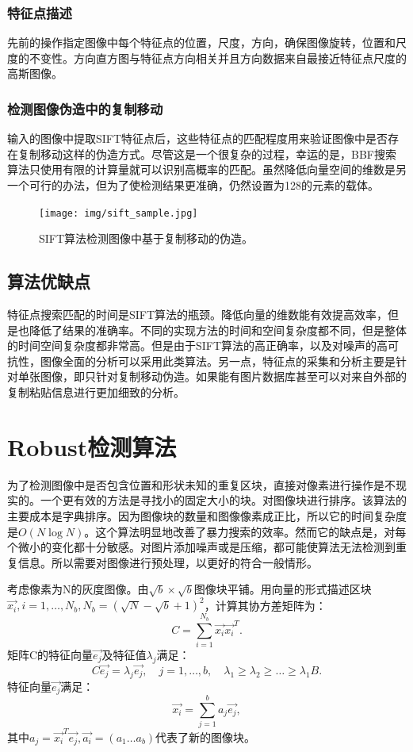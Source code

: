 \documentclass[a4paper, 10pt, notitlepage]{report}
\begin{document}
			\subsubsection{特征点描述}
			先前的操作指定图像中每个特征点的位置，尺度，方向，确保图像旋转，位置和尺度的不变性。方向直方图与特征点方向相关并且方向数据来自最接近特征点尺度的高斯图像。


			\subsubsection{检测图像伪造中的复制移动}
			输入的图像中提取SIFT特征点后，这些特征点的匹配程度用来验证图像中是否存在复制移动这样的伪造方式。尽管这是一个很复杂的过程，幸运的是，BBF搜索算法只使用有限的计算量就可以识别高概率的匹配。虽然降低向量空间的维数是另一个可行的办法，但为了使检测结果更准确，仍然设置为128的元素的载体。
			\begin{figure}[ht]
				\centering
				\texttt{[image: img/sift\_sample.jpg]}
				\caption{SIFT算法检测图像中基于复制移动的伪造。}
				\label{fig-sift}
			\end{figure}

		\subsection{算法优缺点}
		特征点搜索匹配的时间是SIFT算法的瓶颈。降低向量的维数能有效提高效率，但是也降低了结果的准确率。不同的实现方法的时间和空间复杂度都不同，但是整体的时间空间复杂度都非常高。但是由于SIFT算法的高正确率，以及对噪声的高可抗性，图像全面的分析可以采用此类算法。另一点，特征点的采集和分析主要是针对单张图像，即只针对复制移动伪造。如果能有图片数据库甚至可以对来自外部的复制粘贴信息进行更加细致的分析。

	\section{Robust检测算法}
		为了检测图像中是否包含位置和形状未知的重复区块，直接对像素进行操作是不现实的。一个更有效的方法是寻找小的固定大小的块。对图像块进行排序。该算法的主要成本是字典排序。因为图像块的数量和图像像素成正比，所以它的时间复杂度是$O(N\log N)$。这个算法明显地改善了暴力搜索的效率。然而它的缺点是，对每个微小的变化都十分敏感。对图片添加噪声或是压缩，都可能使算法无法检测到重复信息。所以需要对图像进行预处理，以更好的符合一般情形。

		考虑像素为N的灰度图像。由$\sqrt b \times \sqrt b$图像块平铺。用向量的形式描述区块$\vec{x_i}, i=1, \dots, N_b, N_b = (\sqrt N - \sqrt b + 1)^2$，计算其协方差矩阵为：
		\begin{equation}
			C = \sum_{i=1}^{N_b} \vec{x_i}\vec{x_i}^T.
		\end{equation}
		矩阵C的特征向量$\vec{e_j}$及特征值$\lambda_j$满足：
		\begin{equation}
			C\vec{e_j} = \lambda_j\vec{e_j}, \quad j=1,\dots,b, \quad \lambda_1\geq\lambda_2\geq\dots\geq\lambda_1 B.
		\end{equation}
		特征向量$\vec{e_j}$满足：
		\begin{equation}
			\vec{x_i} = \sum_{j=1}^{b} a_j \vec{e_j},
		\end{equation}
		其中$a_j = \vec{x_i}^T \vec{e_j}, \vec{a_i} = (a_1 \dots a_b)$代表了新的图像块。
\end{document}
